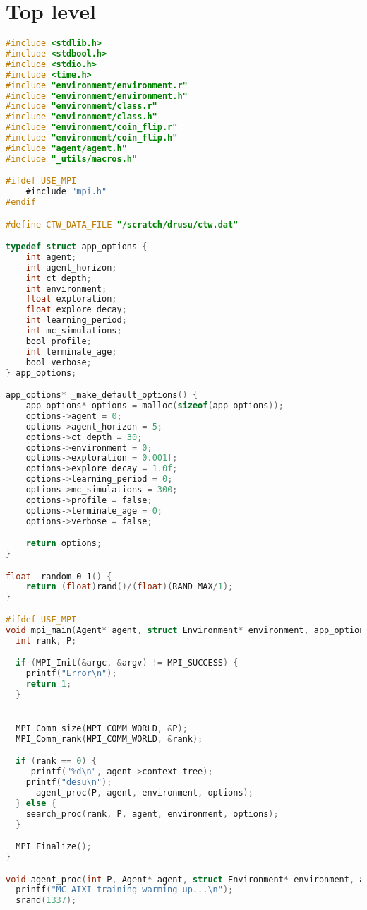 \documentclass[fancychapters]{report}   	%
\begin{document}
\section{Top level}
\begin{lstlisting}[language=C,caption={main.c}]
#include <stdlib.h>
#include <stdbool.h>
#include <stdio.h>
#include <time.h>
#include "environment/environment.r"
#include "environment/environment.h"
#include "environment/class.r"
#include "environment/class.h"
#include "environment/coin_flip.r"
#include "environment/coin_flip.h"
#include "agent/agent.h"
#include "_utils/macros.h"

#ifdef USE_MPI
    #include "mpi.h"
#endif

#define CTW_DATA_FILE "/scratch/drusu/ctw.dat"

typedef struct app_options {
    int agent;
    int agent_horizon;
    int ct_depth;
    int environment;
    float exploration;
    float explore_decay;
    int learning_period;
    int mc_simulations;
    bool profile;
    int terminate_age;
    bool verbose;
} app_options;

app_options* _make_default_options() {
    app_options* options = malloc(sizeof(app_options));
    options->agent = 0;
    options->agent_horizon = 5;
    options->ct_depth = 30;
    options->environment = 0;
    options->exploration = 0.001f;
    options->explore_decay = 1.0f;
    options->learning_period = 0;
    options->mc_simulations = 300;
    options->profile = false;
    options->terminate_age = 0;
    options->verbose = false;

    return options;
}

float _random_0_1() {
    return (float)rand()/(float)(RAND_MAX/1);
}

#ifdef USE_MPI
void mpi_main(Agent* agent, struct Environment* environment, app_options* options, int argc, const char* argv[]) {
  int rank, P;

  if (MPI_Init(&argc, &argv) != MPI_SUCCESS) {
    printf("Error\n");
    return 1;
  }


  MPI_Comm_size(MPI_COMM_WORLD, &P);
  MPI_Comm_rank(MPI_COMM_WORLD, &rank);

  if (rank == 0) {
     printf("%d\n", agent->context_tree);
    printf("desu\n");
      agent_proc(P, agent, environment, options);
  } else {
    search_proc(rank, P, agent, environment, options);
  }

  MPI_Finalize();
}

void agent_proc(int P, Agent* agent, struct Environment* environment, app_options* options) {
  printf("MC AIXI training warming up...\n");
  srand(1337);


\end{lstlisting}
\end{document}

